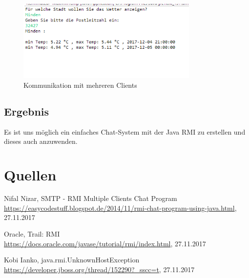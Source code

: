 \begin{figure}[htbp]
\begin{center}
\includegraphics[width=0.8\textwidth]{Bild2}
\caption{Kommunikation mit mehreren Clients}
\end{center}
\end{figure}

\subsection{Ergebnis}
Es ist uns möglich ein einfaches Chat-System mit der Java RMI zu erstellen und dieses auch anzuwenden.

\section{Quellen}
\begin{thebibliography}{999}

 Nifal Nizar, SMTP - RMI Multiple Clients Chat Program \\ \url{https://easycodestuff.blogspot.de/2014/11/rmi-chat-program-using-java.html}, 27.11.2017

 Oracle, Trail: RMI \\ \url{https://docs.oracle.com/javase/tutorial/rmi/index.html}, 27.11.2017

 Kobi Ianko, java.rmi.UnknownHostException \\ \url{https://developer.jboss.org/thread/152290?_sscc=t}, 27.11.2017

\end{thebibliography}
